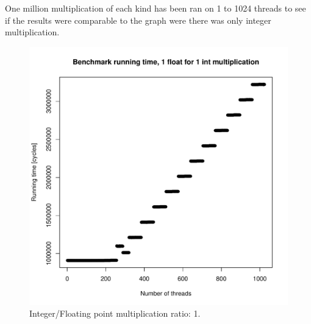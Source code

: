 \documentclass{report}
\def \scalingfactor{.8}
\begin{document}
	One million multiplication of each kind has been ran on 1 to 1024 threads to
    see if the results were comparable to the graph were there was only integer multiplication.
	\begin{figure}[H]
		\centering
		\vspace{-20pt}
    			\includegraphics[width=\scalingfactor\linewidth]{"graphics/running_times_ratio11"}
		\vspace{-15pt}
		\captionsetup{justification=centering}
		\caption{Integer/Floating point multiplication ratio: 1.}
	\end{figure}
	\pagebreak
\end{document}
